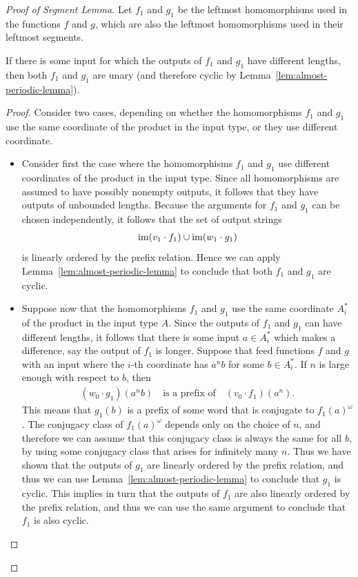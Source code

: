 \begin{proof}[Proof of Segment Lemma]
Let $f_1$ and $g_1$ be the leftmost homomorphisms used in the functions $f$ and $g$, which are also the leftmost homomorphisms used in their leftmost segments. 


\begin{claim}\label{claim:different-lengths-implies-cyclic}
    If there is some input for which the outputs of $f_1$ and $g_1$ have different lengths, then both $f_1$ and $g_1$ are unary (and therefore cyclic by Lemma~\ref{lem:almost-periodic-lemma}).
\end{claim}

\begin{proof}
    Consider two cases, depending on whether the homomorphisms $f_1$ and $g_1$ use the same coordinate of the product in the  input type, or they use different coordinate.
    
    \begin{itemize}
        \item 
    Consider first the case where  the homomorphisms $f_1$ and $g_1$ use different coordinates of the product in the input type. Since all homomorphisms are assumed to have possibly nonempty outputs, it follows that they have outputs of unbounded lengths.  Because the arguments for $f_1$ and $g_1$ can be chosen independently, it follows that the set of output strings
    \begin{align}
        \label{eq:prefix-ordered-image-union-two}
        \operatorname{\mathrm{im}} (v_1 \cdot f_1) \cup \operatorname{\mathrm{im}} (w_1 \cdot g_1)
    \end{align}
    is  linearly ordered by the prefix relation. Hence we can apply Lemma~\ref{lem:almost-periodic-lemma} to conclude that both $f_1$ and $g_1$ are cyclic. 

\item  Suppose now that the homomorphisms $f_1$ and $g_1$ use the same coordinate $A^*_i$ of the product in the input type $A$. Since the outputs of $f_1$ and $g_1$ can have different lengths, it follows that there is some input $a \in A_i^*$ which makes a difference, say the output of $f_1$ is longer.  Suppose that feed functions $f$ and $g$ with an input where the $i$-th coordinate has $a^n b$ for some $b \in A_i^*$. If $n$ is large enough with respect to $b$, then 
    \begin{align*}
    (w_0 \cdot g_1)(a^nb) \quad \text{is a prefix of} \quad 
    (v_0 \cdot f_1)(a^n).
    \end{align*}
    This means that $g_1(b)$ is a prefix of some word that is conjugate to  $f_1(a)^\omega$. The conjugacy class of $f_1(a)^\omega$ depends only on the choice of $n$, and therefore we can assume that this conjugacy class is always the same for all $b$, by using some conjugacy class that arises for infinitely many $n$. Thus we have shown that the outputs of $g_1$ are linearly ordered by the prefix relation, and thus we can use  Lemma~\ref{lem:almost-periodic-lemma} to conclude that $g_1$ is cyclic. This implies in turn that the outputs of $f_1$ are also linearly ordered by the prefix relation, and thus we can use the same argument to conclude that $f_1$ is also cyclic. 
\end{itemize}
\end{proof}


\end{proof}
